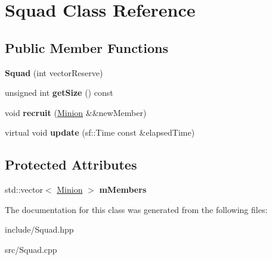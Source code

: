 \hypertarget{class_squad}{}\section{Squad Class Reference}
\label{class_squad}
\subsection*{Public Member Functions}
\begin{DoxyCompactItemize}
\item 
\hypertarget{class_squad_a7bf92f4cbcc960c8298b737d90aa97ad}{}{\bfseries Squad} (int vector\+Reserve)\label{class_squad_a7bf92f4cbcc960c8298b737d90aa97ad}

\item 
\hypertarget{class_squad_a2a4380cce3a79ae58eb93389fa810de1}{}unsigned int {\bfseries get\+Size} () const \label{class_squad_a2a4380cce3a79ae58eb93389fa810de1}

\item 
\hypertarget{class_squad_a9fc8f6a2ffff7ad9a3ae0f9d7625fdb0}{}void {\bfseries recruit} (\hyperlink{class_minion}{Minion} \&\&new\+Member)\label{class_squad_a9fc8f6a2ffff7ad9a3ae0f9d7625fdb0}

\item 
\hypertarget{class_squad_ab191264b403c7da7cdb19d4789b62678}{}virtual void {\bfseries update} (sf\+::\+Time const \&elapsed\+Time)\label{class_squad_ab191264b403c7da7cdb19d4789b62678}

\end{DoxyCompactItemize}
\subsection*{Protected Attributes}
\begin{DoxyCompactItemize}
\item 
\hypertarget{class_squad_a37c0fdfcf6d888d2910771a992495e58}{}std\+::vector$<$ \hyperlink{class_minion}{Minion} $>$ {\bfseries m\+Members}\label{class_squad_a37c0fdfcf6d888d2910771a992495e58}

\end{DoxyCompactItemize}


The documentation for this class was generated from the following files\+:\begin{DoxyCompactItemize}
\item 
include/Squad.\+hpp\item 
src/Squad.\+cpp\end{DoxyCompactItemize}
